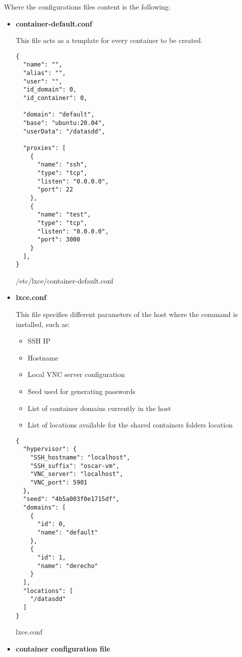 Where the configurations files content is the following:
\begin{itemize}
\newpage
\item{\textbf{container-default.conf}

This file acts as a template for every container to be created.
\begin{listing}[H]
\begin{verbatim}
{
  "name": "",                           
  "alias": "",                          
  "user": "",
  "id_domain": 0,
  "id_container": 0,

  "domain": "default",                 
  "base": "ubuntu:20.04",             
  "userData": "/datasdd",            

  "proxies": [                      
    {
      "name": "ssh",
      "type": "tcp",
      "listen": "0.0.0.0",
      "port": 22
    },
    {
      "name": "test",
      "type": "tcp",
      "listen": "0.0.0.0",
      "port": 3000
    }
  ],
}
\end{verbatim}
\caption{/etc/lxce/container-default.conf}
\label{listings: /etc/lxce/container-default.conf}
\end{listing}
}
\newpage
\item{\textbf{lxce.conf}

This file specifies different parameters of the host where the command is installed, such as:
\begin{itemize}
	\item{SSH IP}
	\item{Hostname}
	\item{Local VNC server configuration}
	\item{Seed used for generating passwords}
	\item{List of container domains currently in the host}
	\item{List of locations available for the shared containers folders location}
\end{itemize}
\begin{listing}[H]
\begin{verbatim}
{
  "hypervisor": {
    "SSH_hostname": "localhost",
    "SSH_suffix": "oscar-vm",
    "VNC_server": "localhost",
    "VNC_port": 5901
  },
  "seed": "4b5a003f0e1715df",
  "domains": [
    {
      "id": 0,
      "name": "default"
    },
    {
      "id": 1,
      "name": "derecho"
    }
  ],
  "locations": [
    "/datasdd"
  ]
}
\end{verbatim}
\caption{lxce.conf}
\label{listings: /etc/lxce/lxce.conf}
\end{listing}
}
\newpage
\item{\textbf{container configuration file}

}
\end{itemize}
